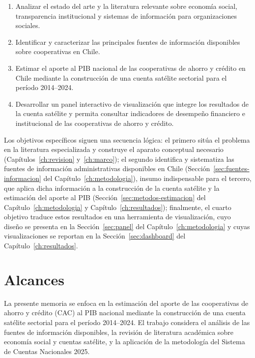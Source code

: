 \begin{enumerate}
 
\item Analizar el estado del arte y la literatura relevante sobre economía social, transparencia institucional y sistemas de información para organizaciones sociales.
 
\item Identificar y caracterizar las principales fuentes de información disponibles sobre cooperativas en Chile.
 
\item Estimar el aporte al PIB nacional de las cooperativas de ahorro y crédito en Chile mediante la construcción de una cuenta satélite sectorial para el período 2014--2024.
 
\item Desarrollar un panel interactivo de visualización que integre los resultados de la cuenta satélite y permita consultar indicadores de desempeño financiero e institucional de las cooperativas de ahorro y crédito.

\end{enumerate}
 Los objetivos específicos siguen una secuencia lógica: el primero sitúa el
problema en la literatura especializada y construye el aparato conceptual
necesario (Capítulos~\ref{ch:revision} y~\ref{ch:marco}); el segundo
identifica y sistematiza las fuentes de información administrativas
disponibles en Chile (Sección~\ref{sec:fuentes-informacion} del
Capítulo~\ref{ch:metodologia}), insumo indispensable para el tercero, que
aplica dicha información a la construcción de la cuenta satélite y la
estimación del aporte al PIB (Sección~\ref{sec:metodos-estimacion} del
Capítulo~\ref{ch:metodologia} y Capítulo~\ref{ch:resultados}); finalmente,
el cuarto objetivo traduce estos resultados en una herramienta de
visualización, cuyo diseño se presenta en la
Sección~\ref{sec:panel} del Capítulo~\ref{ch:metodologia} y cuyas
visualizaciones se reportan en la Sección~\ref{sec:dashboard} del
Capítulo~\ref{ch:resultados}.
\section{Alcances}
 
La presente memoria se enfoca en la estimación del aporte de las cooperativas de ahorro y crédito (CAC) al PIB nacional mediante la construcción de una cuenta satélite sectorial para el período 2014--2024. El trabajo considera el análisis de las fuentes de información disponibles, la revisión de literatura académica sobre economía social y cuentas satélite, y la aplicación de la metodología del Sistema de Cuentas Nacionales 2025.
 
